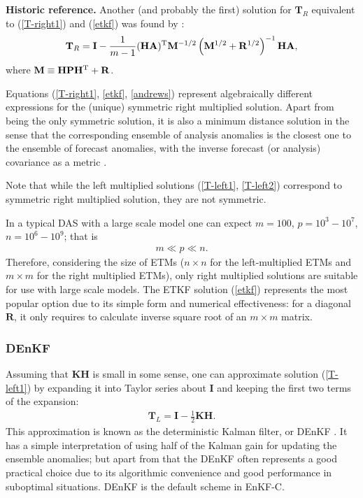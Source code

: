 \documentclass[11pt]{report}
\newcommand{\mb} {\mathbf}
\newcommand{\T}{^{\tiny \mathrm T}}
\begin{document}
{
  \scriptsize
  {\bf Historic reference.} Another (and probably the first) solution for $\mb T_R$ equivalent to (\ref{T-right1}) and (\ref{etkf}) was found by \citet{and68a}:
  \setlength{\abovedisplayskip}{1pt}
  \setlength{\belowdisplayskip}{3pt}
  \begin{align}
    \label{andrews}
    \mb T_R = \mb I - \frac{1}{m-1} (\mb H \mb A)\T \mb M^{-1/2} \left(\mb M^{1/2} + \mb R^{1/2}\right)^{-1} \mb H \mb A,
  \end{align}
  where $\mb M \equiv \mb H \mb P \mb H\T + \mb R$.
}

Equations (\ref{T-right1}, \ref{etkf}, \ref{andrews}) represent algebraically different expressions for the (unique) symmetric right multiplied solution.
Apart from being the only symmetric solution, it is also a minimum distance solution in the sense that the corresponding ensemble of analysis anomalies is the closest one to the ensemble of forecast anomalies, with the inverse forecast (or analysis) covariance as a metric \citep{ott03a}.

Note that while the left multiplied solutions (\ref{T-left1}, \ref{T-left2}) correspond to symmetric right multiplied solution, they are not symmetric.

In a typical DAS with a large scale model one can expect $m = 100$, $p = 10^3-10^7$, $n = 10^6-10^9$; that is
\begin{align}
  m \ll p \ll n.
\end{align}
Therefore, considering the size of ETMs ($n \times n$ for the left-multiplied ETMs and $m \times m$ for the right multiplied ETMs), only right multiplied solutions are suitable for use with large scale models.
The ETKF solution (\ref{etkf}) represents the most popular option due to its simple form and numerical effectiveness: for a diagonal $\mb R$, it only requires to calculate inverse square root of an $m \times m$ matrix.

\subsubsection{DEnKF}

Assuming that $\mb K \mb H$ is small in some sense, one can approximate solution (\ref{T-left1}) by expanding it into Taylor series about $\mb I$ and keeping the first two terms of the expansion:
\begin{align}
  \label{denkf}
  \mb T_L = \mb I - \frac{1}{2} \mb K \mb H.
\end{align}
This approximation is known as the deterministic Kalman filter, or DEnKF \citep{sak08a}.
It has a simple interpretation of using half of the Kalman gain for updating the ensemble anomalies; but apart from that the DEnKF often represents a good practical choice due to its algorithmic convenience and good performance in suboptimal situations.
DEnKF is the default scheme in EnKF-C.
\end{document}

